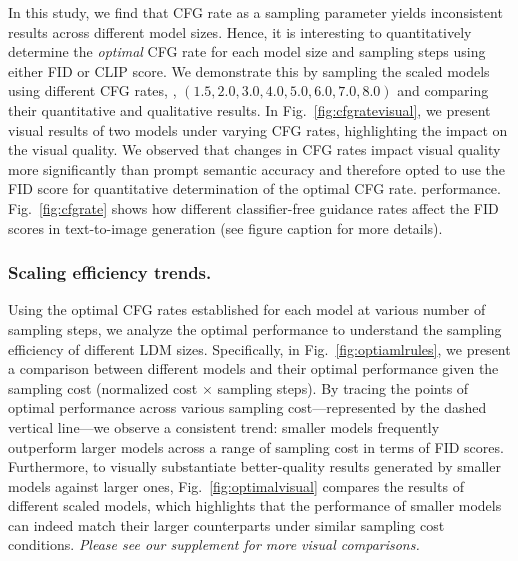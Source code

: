 In this study, we find that CFG rate as a sampling parameter yields inconsistent results across different model sizes.
Hence, it is interesting to quantitatively determine the \textit{optimal} CFG rate for each model size and sampling steps using either FID or CLIP score.
We demonstrate this by sampling the scaled models using different CFG rates, \ie, $(1.5, 2.0, 3.0, 4.0, 5.0, 6.0, 7.0, 8.0)$ and comparing their quantitative and qualitative results. 
%
%
In Fig.~\ref{fig:cfgratevisual}, we present visual results of two models under varying CFG rates, highlighting the impact on the visual quality. We observed that changes in CFG rates impact visual quality more significantly than prompt semantic accuracy and therefore opted to use the FID score for quantitative determination of the optimal CFG rate. performance. Fig.~\ref{fig:cfgrate} shows how different classifier-free guidance rates affect the FID scores in text-to-image generation (see figure caption for more details). 


\subsubsection{Scaling efficiency trends.}
\label{sec:optimalmodelsizes}

Using the optimal CFG rates established for each model at various number of sampling steps, we analyze the optimal performance to understand the sampling efficiency of different LDM sizes.
%
%
Specifically, in Fig.~\ref{fig:optiamlrules}, we present a comparison between different models and their optimal performance given the sampling cost (normalized cost $\times$ sampling steps).
By tracing the points of optimal performance across various sampling cost---represented by the dashed vertical line---we observe a consistent trend: smaller models frequently outperform larger models across a range of sampling cost in terms of FID scores.
Furthermore, to visually substantiate better-quality results generated by smaller models against larger ones, Fig.~\ref{fig:optimalvisual} compares the results of different scaled models, which highlights that the performance of smaller models can indeed match their larger counterparts under similar sampling cost conditions.
\emph{
Please see our supplement for more visual comparisons.
}

